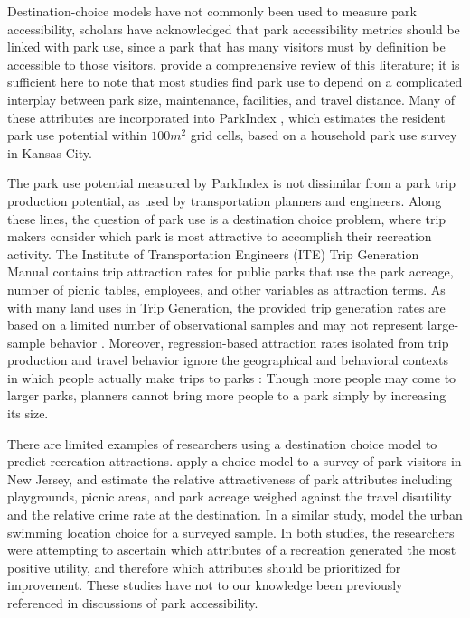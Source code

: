 \documentclass[]{elsarticle} %
\begin{document}
Destination-choice models have not commonly been used to measure park
accessibility, scholars have acknowledged that park accessibility metrics should
be linked with park use, since a park that has many visitors must by definition
be accessible to those visitors. \citet{McCormack2010} provide a comprehensive review
of this literature; it is sufficient here to note that most studies find park
use to depend on a complicated interplay between park size, maintenance,
facilities, and travel distance. Many of these attributes are incorporated into
ParkIndex \citep{Kaczynski2016}, which estimates the resident park use potential
within \(100 m^2\) grid cells, based on a household park use survey in Kansas
City.

The park use potential measured by ParkIndex is not dissimilar from a park trip
production potential, as used by transportation planners and engineers. Along
these lines, the question of park use is a destination choice problem, where
trip makers consider which park is most attractive to accomplish their
recreation activity. The Institute of Transportation Engineers (ITE) Trip
Generation Manual \citeyearpar{ite2019} contains trip attraction rates for public parks
that use the park acreage, number of picnic tables, employees, and other
variables as attraction terms. As with many land uses in Trip Generation, the
provided trip generation rates are based on a limited number of observational
samples \citep{shoup_truth_2003} and may not represent large-sample behavior
\citep{Millard-Ball2015}. Moreover, regression-based attraction rates isolated from
trip production and travel behavior ignore the geographical and behavioral
contexts in which people actually make trips to parks \citep{Barnard1987}: Though
more people may come to larger parks, planners cannot bring more people to a
park simply by increasing its size.

There are limited examples of researchers using a destination choice model to
predict recreation attractions. \citet{Kinnell2006} apply a choice model to a survey of
park visitors in New Jersey, and estimate the relative attractiveness of park
attributes including playgrounds, picnic areas, and park acreage weighed against
the travel disutility and the relative crime rate at the destination. In a
similar study, \citet{Meyerhoff2010} model the urban swimming location choice for a
surveyed sample. In both studies, the researchers were attempting to ascertain
which attributes of a recreation generated the most positive utility, and
therefore which attributes should be prioritized for improvement. These studies
have not to our knowledge been previously referenced in discussions of park
accessibility.
\end{document}
